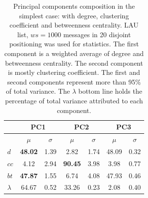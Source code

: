 \documentclass[%
 aip,
 jmp,%
 amsmath,amssymb,
 reprint,%
]{revtex4-1}
\begin{document}
\begin{table}[H]
  \centering
  \caption{Principal components composition in the simplest case: with degree, clustering coefficient and betweenness centrality. LAU list, $ws=1000$ messages in 20 disjoint positioning was used for statistics. The first component is a weighted average of degree and betweenness centrality. The second component is mostly clustering coefficient. The first and second components represent more than 95\% of total variance. The $\lambda$ bottom line holds the percentage of total variance attributed to each component.}
  \begin{tabular}{|l|c|c| c|c| c|c|}\hline
 & \multicolumn{2}{c|}{PC1}          & \multicolumn{2}{c|}{PC2} & \multicolumn{2}{c|}{PC3}  \\\hline
       & $\mu$            & $\sigma$ & $\mu$         & $\sigma$ & $\mu$ & $\sigma$  \\\hline
$d$       & {\bf 48.02}   & 1.39     & 2.82          & 1.74     & 48.09  & 0.32 \\
$cc$      & 4.12          & 2.94     & {\bf 90.45}   & 3.98     & 3.98  & 0.77 \\ 
$bt$      & {\bf 47.87}   & 1.55     & 6.74          & 4.08     & 47.93 & 0.46 \\ \hline
$\lambda$ & 64.67         & 0.52     & 33.26         & 0.23     & 2.08  & 0.40 \\ \hline
  \end{tabular}
  \label{compPCA0}
\end{table}
\end{document}

